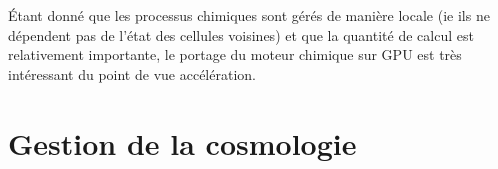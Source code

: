 Étant donné que les processus chimiques sont gérés de manière locale (ie ils ne dépendent pas de l'état des cellules voisines) et que la quantité de calcul est relativement importante, le portage du moteur chimique sur \ac{GPU} est très intéressant du point de vue accélération.

\clearpage
\section{Gestion de la cosmologie}
\label{sec:supercomobil}



%
%
%
%

